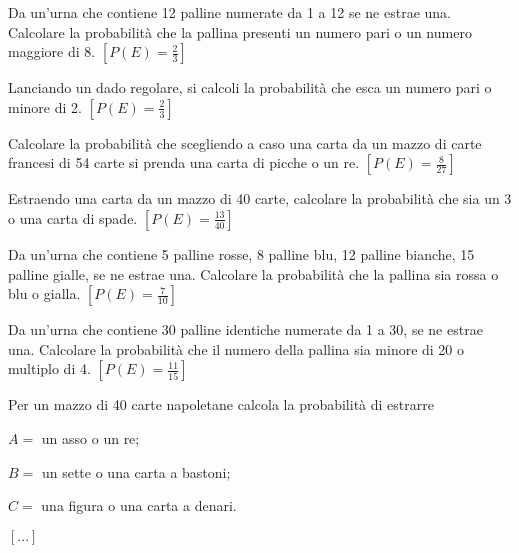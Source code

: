 \begin{esercizio}[\Ast]
 \label{ese:9.30}
Da un'urna che contiene 12 palline numerate da 1 a 12 se ne estrae una. 
Calcolare la probabilità che la pallina presenti un numero pari o un numero 
maggiore di 8.
\hfill $\left[P(E)=\frac 2 3\right]$
\end{esercizio}

\begin{esercizio}[\Ast]
 \label{ese:9.31}
Lanciando un dado regolare, si calcoli la probabilità che esca un numero pari o 
minore di 2.
\hfill $\left[P(E)=\frac 2 3\right]$
\end{esercizio}

\begin{esercizio}[\Ast]
 \label{ese:9.32}
Calcolare la probabilità che scegliendo a caso una carta da un mazzo di carte 
francesi di 54 carte si prenda una carta di picche o un re.
\hfill $\left[P(E)=\frac 8{27}\right]$
\end{esercizio}

\begin{esercizio}[\Ast]
 \label{ese:9.33}
Estraendo una carta da un mazzo di 40 carte, calcolare la probabilità che sia un 
3 o una carta di spade.
\hfill $\left[P(E)=\frac{13}{40}\right]$
\end{esercizio}

\begin{esercizio}[\Ast]
 \label{ese:9.34}
 Da un'urna che contiene 5 palline rosse, 8 palline blu, 12 palline bianche, 15 
palline gialle, se ne estrae una. Calcolare la probabilità che la pallina sia 
rossa o blu o gialla.
\hfill $\left[P(E)=\frac 7{10}\right]$
\end{esercizio}

\begin{esercizio}[\Ast]
 \label{ese:9.35}
Da un'urna che contiene 30 palline identiche numerate da 1 a 30, se ne estrae 
una. Calcolare la probabilità che il numero della pallina sia minore di 20 o 
multiplo di 4.
\hfill $\left[P(E)=\frac{11}{15}\right]$
\end{esercizio}

\begin{esercizio}
 \label{ese:9.36}
Per un mazzo di 40 carte napoletane calcola la probabilità di estrarre
\begin{itemize*}
\item $ A= $ un asso o un re;
\item $ B= $ un sette o una carta a bastoni;
\item $ C= $ una figura o una carta a denari.
\end{itemize*}
\hfill $\left[...\right]$
\end{esercizio}

